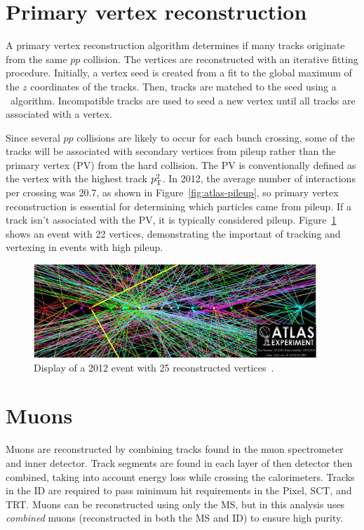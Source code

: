 \section{Primary vertex reconstruction}
A primary vertex reconstruction algorithm determines if many tracks originate from the same $pp$ collision\cite{ATLAS-CONF-2010-069,ATLAS-CONF-2012-042}. The vertices are reconstructed with an iterative fitting procedure. Initially, a vertex seed is created from a fit to the global maximum of the $z$ coordinates of the tracks. Then, tracks are matched to the seed using a \chisq\ algorithm. Incompatible tracks are used to seed a new vertex until all tracks are associated with a vertex.

Since several $pp$ collisions are likely to occur for each bunch crossing, some of the tracks will be associated with secondary vertices from pileup rather than the primary vertex (PV) from the hard collision. The PV is conventionally defined as the vertex with the highest track $p_{\text{T}}^2$. In 2012, the average number of interactions per crossing was 20.7, as shown in Figure~\ref{fig:atlas-pileup}, so primary vertex reconstruction is essential for determining which particles came from pileup. If a track isn't associated with the PV, it is typically considered pileup. Figure~\ref{fig:disppileup} shows an event with 22 vertices, demonstrating the important of tracking and vertexing in events with high pileup.


\begin{figure}[tp]
  \centering
  \includegraphics[width=0.95\textwidth]{fig/atlas/pileupEvent}
  \caption{Display of a 2012 event with 25 reconstructed vertices~\cite{eventdisp}.}
  \label{fig:disppileup}
\end{figure}

\section{Muons}
Muons are reconstructed by combining tracks found in the muon spectrometer and inner detector. Track segments are found in each layer of then detector then combined, taking into account energy loss while crossing the calorimeters. Tracks in the ID are required to pass minimum hit requirements in the Pixel, SCT, and TRT. Muons can be reconstructed using only the MS, but in this analysis uses \emph{combined} muons (reconstructed in both the MS and ID) to ensure high purity.

